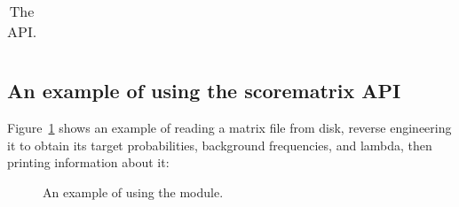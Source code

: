 \begin{table}[hbp]
\begin{center}
{\begin{tabular}{|ll|}

\hline
\end{tabular}
}
\end{center}
\caption{The  API.}
\label{tbl:scorematrix_api}
\end{table}

\subsection{An example of using the scorematrix API}

Figure~\ref{fig:scorematrix_example} shows an example of reading a
matrix file from disk, reverse engineering it \citep{YuAltschul03} to
obtain its target probabilities, background frequencies, and lambda,
then printing information about it:

\begin{figure}

\caption{An example of using the  module.}
\label{fig:scorematrix_example}
\end{figure}
